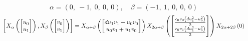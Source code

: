 \documentclass[11pt]{article}
\theoremstyle{definition}
\begin{document}
\[
\alpha = \left( 0, \  -1, \  0, \  0, \  0\right), \quad \beta = \left( -1, \  1, \  0, \  0, \  0\right)
\]
\[
\scaletoalign{\textwidth}{\left[ X_{\alpha}\left(\left[\begin{matrix}u_{0}\\u_{1}\end{matrix}\right]\right), X_{\beta}\left(\left[\begin{matrix}v_{0}\\v_{1}\end{matrix}\right]\right) \right] = X_{\alpha + \beta}\left(\left[\begin{matrix}d u_{1} v_{1} + u_{0} v_{0}\\u_{0} v_{1} + u_{1} v_{0}\end{matrix}\right]\right) X_{2\alpha + \beta}\left(\left[\begin{matrix}\frac{c_{0} v_{0} \left(d u_{1}^{2} - u_{0}^{2}\right)}{2}\\\frac{c_{0} v_{1} \left(d u_{1}^{2} - u_{0}^{2}\right)}{2}\end{matrix}\right]\right) X_{2\alpha + 2\beta}\left(0\right)}
\]
\end{document}
